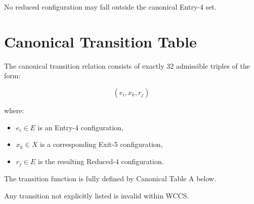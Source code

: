 \documentclass[11pt]{article}
\begin{document}
No reduced configuration may fall outside the canonical Entry-4 set.

\section{Canonical Transition Table}
The canonical transition relation consists of exactly 32 admissible triples of the form:

\[
(e_i, x_k, r_j)
\]

where:

\begin{itemize}
\item $e_i \in E$ is an Entry-4 configuration,
\item $x_k \in X$ is a corresponding Exit-5 configuration,
\item $r_j \in E$ is the resulting Reduced-4 configuration.
\end{itemize}

The transition function is fully defined by Canonical Table A below.

Any transition not explicitly listed is invalid within WCCS.
\end{document}
